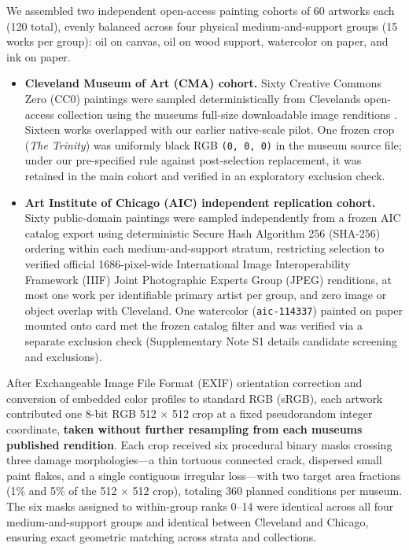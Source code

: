 \documentclass[fleqn,12pt,lineno]{wlpeerj}
\providecommand{\tightlist}{\setlength{\itemsep}{0pt}\setlength{\parskip}{0pt}}
\begin{document}
We assembled two independent open-access painting cohorts of 60 artworks each (120 total), evenly balanced across four physical medium-and-support groups (15 works per group): oil on canvas, oil on wood support, watercolor on paper, and ink on paper.

\begin{itemize}
\tightlist
\item
  \textbf{Cleveland Museum of Art (CMA) cohort.} Sixty Creative Commons Zero (CC0) paintings were sampled deterministically from Cleveland\textquotesingle s open-access collection using the museum\textquotesingle s full-size downloadable image renditions \citetext{\citeauthor{cma-openaccess}, n.d.}. Sixteen works overlapped with our earlier native-scale pilot. One frozen crop (\emph{The Trinity}) was uniformly black RGB \texttt{(0,\ 0,\ 0)} in the museum source file; under our pre-specified rule against post-selection replacement, it was retained in the main cohort and verified in an exploratory exclusion check.
\item
  \textbf{Art Institute of Chicago (AIC) independent replication cohort.} Sixty public-domain paintings were sampled independently from a frozen AIC catalog export \citetext{\citeauthor{aic-openaccess}, n.d.} using deterministic Secure Hash Algorithm 256 (SHA-256) ordering within each medium-and-support stratum, restricting selection to verified official 1686-pixel-wide International Image Interoperability Framework (IIIF) Joint Photographic Experts Group (JPEG) renditions, at most one work per identifiable primary artist per group, and zero image or object overlap with Cleveland. One watercolor (\texttt{aic-114337}) painted on paper mounted onto card met the frozen catalog filter and was verified via a separate exclusion check (Supplementary Note S1 details candidate screening and exclusions).
\end{itemize}

After Exchangeable Image File Format (EXIF) orientation correction and conversion of embedded color profiles to standard RGB (sRGB), each artwork contributed one 8-bit RGB 512 \ensuremath{\times} 512 crop at a fixed pseudorandom integer coordinate, \textbf{taken without further resampling from each museum\textquotesingle s published rendition}. Each crop received six procedural binary masks crossing three damage morphologies---a thin tortuous connected crack, dispersed small paint flakes, and a single contiguous irregular loss---with two target area fractions (1\% and 5\% of the 512 \ensuremath{\times} 512 crop), totaling 360 planned conditions per museum. The six masks assigned to within-group ranks 0--14 were identical across all four medium-and-support groups and identical between Cleveland and Chicago, ensuring exact geometric matching across strata and collections.
\end{document}
